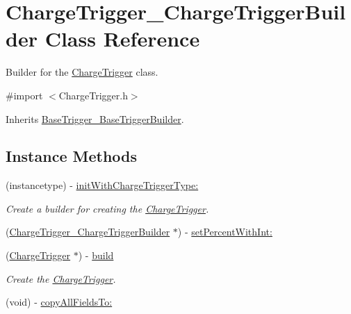 \hypertarget{interface_charge_trigger___charge_trigger_builder}{}\section{Charge\+Trigger\+\_\+\+Charge\+Trigger\+Builder Class Reference}
\label{interface_charge_trigger___charge_trigger_builder}


Builder for the \hyperlink{interface_charge_trigger}{Charge\+Trigger} class.  




{\ttfamily \#import $<$Charge\+Trigger.\+h$>$}



Inherits \hyperlink{interface_base_trigger___base_trigger_builder}{Base\+Trigger\+\_\+\+Base\+Trigger\+Builder}.

\subsection*{Instance Methods}
\begin{DoxyCompactItemize}
\item 
(instancetype) -\/ \hyperlink{interface_charge_trigger___charge_trigger_builder_a6c0788de16254daf9fedef3575bf857a}{init\+With\+Charge\+Trigger\+Type\+:}
\begin{DoxyCompactList}\small\item\em Create a builder for creating the \hyperlink{interface_charge_trigger}{Charge\+Trigger}. \end{DoxyCompactList}\item 
(\hyperlink{interface_charge_trigger___charge_trigger_builder}{Charge\+Trigger\+\_\+\+Charge\+Trigger\+Builder} $\ast$) -\/ \hyperlink{interface_charge_trigger___charge_trigger_builder_a68ce0f5b13356ced87ac1365ae39c647}{set\+Percent\+With\+Int\+:}
\item 
(\hyperlink{interface_charge_trigger}{Charge\+Trigger} $\ast$) -\/ \hyperlink{interface_charge_trigger___charge_trigger_builder_a4cb65484e366fbe80293dcabdb4e61e4}{build}
\begin{DoxyCompactList}\small\item\em Create the \hyperlink{interface_charge_trigger}{Charge\+Trigger}. \end{DoxyCompactList}\item 
(void) -\/ \hyperlink{interface_charge_trigger___charge_trigger_builder_a006df63b30bc6bb0668c3ade22c40bd6}{copy\+All\+Fields\+To\+:}
\end{DoxyCompactItemize}
